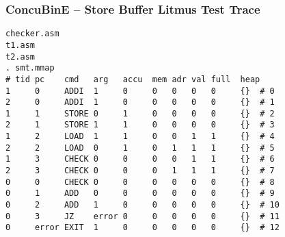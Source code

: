 \documentclass{beamer}
\begin{document}
\begin{frame}[fragile]
\end{frame}

\begin{frame}[fragile]
  \frametitle{ConcuBinE -- Store Buffer Litmus Test Trace}
  \centering
  \begin{lstlisting}[style=asm,xleftmargin=-.3cm]
checker.asm
t1.asm
t2.asm
. smt.mmap
# tid pc    cmd   arg   accu  mem adr val full  heap
1     0     ADDI  1     0     0   0   0   0     {}  # 0
2     0     ADDI  1     0     0   0   0   0     {}  # 1
1     1     STORE 0     1     0   0   0   0     {}  # 2
2     1     STORE 1     1     0   0   0   0     {}  # 3
1     2     LOAD  1     1     0   0   1   1     {}  # 4
2     2     LOAD  0     1     0   1   1   1     {}  # 5
1     3     CHECK 0     0     0   0   1   1     {}  # 6
2     3     CHECK 0     0     0   1   1   1     {}  # 7
0     0     CHECK 0     0     0   0   0   0     {}  # 8
0     1     ADD   0     0     0   0   0   0     {}  # 9
0     2     ADD   1     0     0   0   0   0     {}  # 10
0     3     JZ    error 0     0   0   0   0     {}  # 11
0     error EXIT  1     0     0   0   0   0     {}  # 12
\end{lstlisting}
\end{frame}
\end{document}
